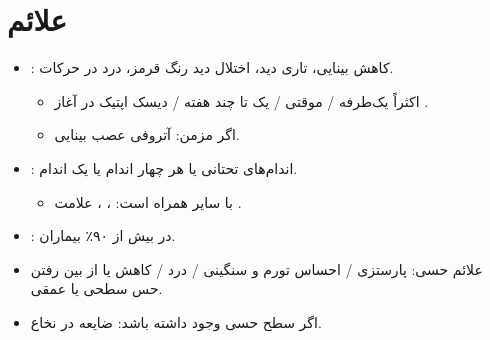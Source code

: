 \documentclass[a4paper,12pt]{extbook}
\begin{document}
\section*{علائم}
\begin{itemize}
\item {}: کاهش بینایی، تاری دید، اختلال دید رنگ قرمز، درد در حرکات.
\begin{itemize}
\item اکثراً یک‌طرفه / موقتی / یک تا چند هفته / دیسک اپتیک در آغاز .
\item اگر مزمن: آتروفی عصب بینایی.
\end{itemize}
\item {}: اندام‌های تحتانی یا هر چهار اندام یا یک اندام.
\begin{itemize}
\item {} با سایر  همراه است: ، ، علامت .
\end{itemize}
\item {}: در بیش از ۹۰٪ بیماران.
\item علائم حسی: پارستزی / احساس تورم و سنگینی / درد / کاهش یا از بین رفتن حس سطحی یا عمقی.
\item اگر سطح حسی وجود داشته باشد: ضایعه در نخاع.
\end{itemize}
\end{document}
